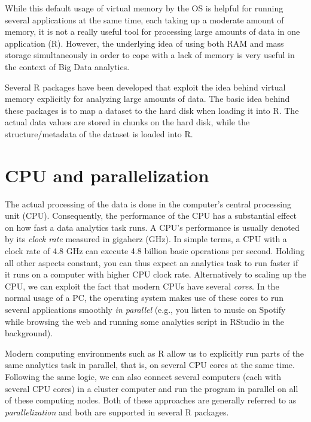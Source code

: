 \documentclass[
  12pt,
]{style/krantz}
\begin{document}
While this default usage of virtual memory by the OS is helpful for running several applications at the same time, each taking up a moderate amount of memory, it is not a really useful tool for processing large amounts of data in one application (R). However, the underlying idea of using both RAM and mass storage simultaneously in order to cope with a lack of memory is very useful in the context of Big Data analytics.

Several R packages have been developed that exploit the idea behind virtual memory explicitly for analyzing large amounts of data. The basic idea behind these packages is to map a dataset to the hard disk when loading it into R. The actual data values are stored in chunks on the hard disk, while the structure/metadata of the dataset is loaded into R.

\hypertarget{cpu-and-parallelization}{%
\section{CPU and parallelization}\label{cpu-and-parallelization}}

The actual processing of the data is done in the computer's central processing unit (CPU). Consequently, the performance of the CPU has a substantial effect on how fast a data analytics task runs. A CPU's performance is usually denoted by its \emph{clock rate} measured in gigaherz (GHz). In simple terms, a CPU with a clock rate of 4.8 GHz can execute 4.8 billion basic operations per second. Holding all other aspects constant, you can thus expect an analytics task to run faster if it runs on a computer with higher CPU clock rate. Alternatively to scaling up the CPU, we can exploit the fact that modern CPUs have several \emph{cores}. In the normal usage of a PC, the operating system makes use of these cores to run several applications smoothly \emph{in parallel} (e.g., you listen to music on Spotify while browsing the web and running some analytics script in RStudio in the background).

Modern computing environments such as R allow us to explicitly run parts of the same analytics task in parallel, that is, on several CPU cores at the same time. Following the same logic, we can also connect several computers (each with several CPU cores) in a cluster computer and run the program in parallel on all of these computing nodes. Both of these approaches are generally referred to as \emph{parallelization} and both are supported in several R packages.
\end{document}
